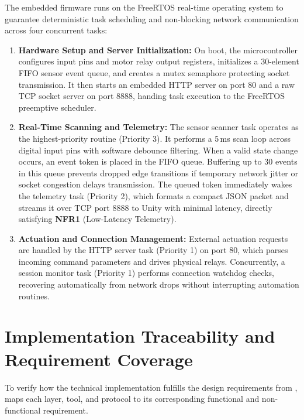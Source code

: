 The embedded firmware runs on the FreeRTOS real-time operating system to guarantee deterministic task scheduling and non-blocking network communication across four concurrent tasks:
\begin{enumerate}
    \item \textbf{Hardware Setup and Server Initialization:} On boot, the microcontroller configures input pins and motor relay output registers, initializes a 30-element \gls{FIFO} sensor event queue, and creates a mutex semaphore protecting socket transmission. It then starts an embedded \gls{HTTP} server on port 80 and a raw \gls{TCP} socket server on port 8888, handing task execution to the FreeRTOS preemptive scheduler.
    \item \textbf{Real-Time Scanning and Telemetry:} The sensor scanner task operates as the highest-priority routine (Priority 3). It performs a 5\,ms scan loop across digital input pins with software debounce filtering. When a valid state change occurs, an event token is placed in the \gls{FIFO} queue. Buffering up to 30 events in this queue prevents dropped edge transitions if temporary network jitter or socket congestion delays transmission. The queued token immediately wakes the telemetry task (Priority 2), which formats a compact \gls{JSON} packet and streams it over \gls{TCP} port 8888 to Unity with minimal latency, directly satisfying \textbf{NFR1} (Low-Latency Telemetry).
    \item \textbf{Actuation and Connection Management:} External actuation requests are handled by the \gls{HTTP} server task (Priority 1) on port 80, which parses incoming command parameters and drives physical relays. Concurrently, a session monitor task (Priority 1) performs connection watchdog checks, recovering automatically from network drops without interrupting automation routines.
\end{enumerate}

\section{Implementation Traceability and Requirement Coverage}
\label{sec:impl_traceability}

To verify how the technical implementation fulfills the design requirements from ,  maps each layer, tool, and protocol to its corresponding functional and non-functional requirement.

